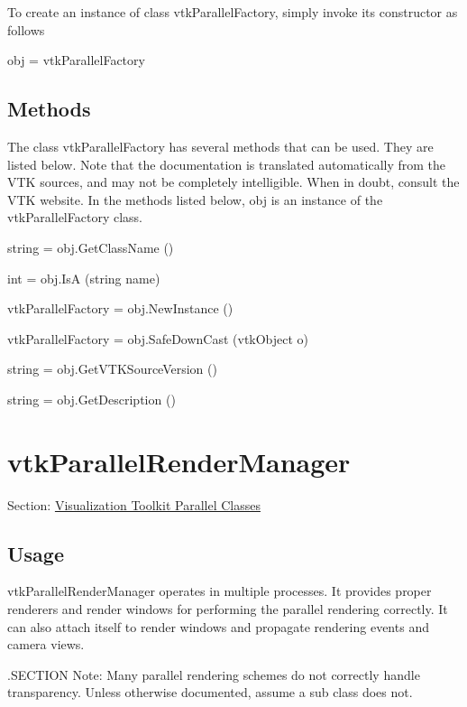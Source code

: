 To create an instance of class vtk\-Parallel\-Factory, simply invoke its constructor as follows \begin{DoxyVerb}  obj = vtkParallelFactory
\end{DoxyVerb}
 \hypertarget{vtkwidgets_vtkxyplotwidget_Methods}{}\subsection{Methods}\label{vtkwidgets_vtkxyplotwidget_Methods}
The class vtk\-Parallel\-Factory has several methods that can be used. They are listed below. Note that the documentation is translated automatically from the V\-T\-K sources, and may not be completely intelligible. When in doubt, consult the V\-T\-K website. In the methods listed below, {\ttfamily obj} is an instance of the vtk\-Parallel\-Factory class. 
\begin{DoxyItemize}
\item {\ttfamily string = obj.\-Get\-Class\-Name ()}  
\item {\ttfamily int = obj.\-Is\-A (string name)}  
\item {\ttfamily vtk\-Parallel\-Factory = obj.\-New\-Instance ()}  
\item {\ttfamily vtk\-Parallel\-Factory = obj.\-Safe\-Down\-Cast (vtk\-Object o)}  
\item {\ttfamily string = obj.\-Get\-V\-T\-K\-Source\-Version ()}  
\item {\ttfamily string = obj.\-Get\-Description ()}  
\end{DoxyItemize}\hypertarget{vtkparallel_vtkparallelrendermanager}{}\section{vtk\-Parallel\-Render\-Manager}\label{vtkparallel_vtkparallelrendermanager}
Section\-: \hyperlink{sec_vtkparallel}{Visualization Toolkit Parallel Classes} \hypertarget{vtkwidgets_vtkxyplotwidget_Usage}{}\subsection{Usage}\label{vtkwidgets_vtkxyplotwidget_Usage}
vtk\-Parallel\-Render\-Manager operates in multiple processes. It provides proper renderers and render windows for performing the parallel rendering correctly. It can also attach itself to render windows and propagate rendering events and camera views.

.S\-E\-C\-T\-I\-O\-N Note\-: Many parallel rendering schemes do not correctly handle transparency. Unless otherwise documented, assume a sub class does not.

